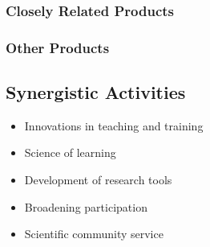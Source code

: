 \documentclass[10pt]{NSF}
\begin{document}
\subsubsection{Closely Related Products}
\label{sec:related_products}

\subsubsection{Other Products}
\label{sec:other_products}

\subsection{Synergistic Activities}
\label{sec:synergy}

\begin{itemize}
\item{Innovations in teaching and training}
\item{Science of learning}
\item{Development of research tools}
\item{Broadening participation}
\item{Scientific community service}
\end{itemize}
\end{document}
